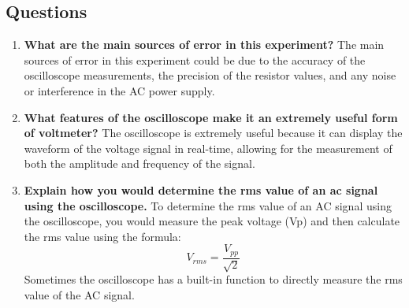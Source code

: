\documentclass[a4paper]{article}
\begin{document}
\subsection{Questions}

\begin{enumerate}
    \item \textbf{What are the main sources of error in this experiment?} The main sources of error in this experiment could be due to the accuracy of the oscilloscope measurements, the precision of the resistor values, and any noise or interference in the AC power supply.
    \item \textbf{What features of the oscilloscope make it an extremely useful form of voltmeter?} The oscilloscope is extremely useful because it can display the waveform of the voltage signal in real-time, allowing for the measurement of both the amplitude and frequency of the signal. 
    \item \textbf{Explain how you would determine the rms value of an ac signal using the oscilloscope.} To determine the rms value of an AC signal using the oscilloscope, you would measure the peak voltage (Vp) and then calculate the rms value using the formula:
    \[V_{rms} = \frac{V_{pp}}{\sqrt{2}}\]
    Sometimes the oscilloscope has a built-in function to directly measure the rms value of the AC signal.
\end{enumerate}
\end{document}

